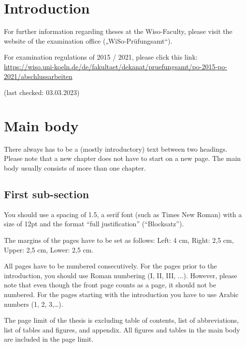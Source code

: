 \documentclass[a4paper,12pt, titlepage]{article}
\begin{document}
\newpage{}


\setcounter{page}{1}

\section{Introduction}\label{Introduction}
For further information regarding theses at the Wiso-Faculty, please visit the website of the examination office („WiSo-Prüfungsamt“).  \par 
For examination regulations of 2015 / 2021, please click this link: \\
 \url{https://wiso.uni-koeln.de/de/fakultaet/dekanat/pruefungsamt/po-2015-po-2021/abschlussarbeiten} \par
 
(last checked: 03.03.2023)

\section{Main body}\label{Main Body}
There always has to be a (mostly introductory) text between two headings. Please note that a new chapter does not have to start on a new page. The main body usually consists of more than one chapter.

\subsection{First sub-section}\label{2.1}
You should use a spacing of 1.5, a serif font (such as Times New Roman) with a size of 12pt and the format “full justification” (“Blocksatz”). \par
The margins of the pages have to be set as follows: Left: 4 cm, Right: 2,5 cm, Upper: 2,5 cm, Lower: 2,5 cm. \par
All pages have to be numbered consecutively. For the pages prior to the introduction, you should use Roman numbering (I, II, III, ...). However, please note that even though the front page counts as a page, it should not be numbered. For the pages starting with the introduction you have to use Arabic numbers (1, 2, 3,…). \par
The page limit of the thesis is excluding table of contents, list of abbreviations, list of tables and figures, and appendix. All figures and tables in the main body are included in the page limit.
\end{document}
